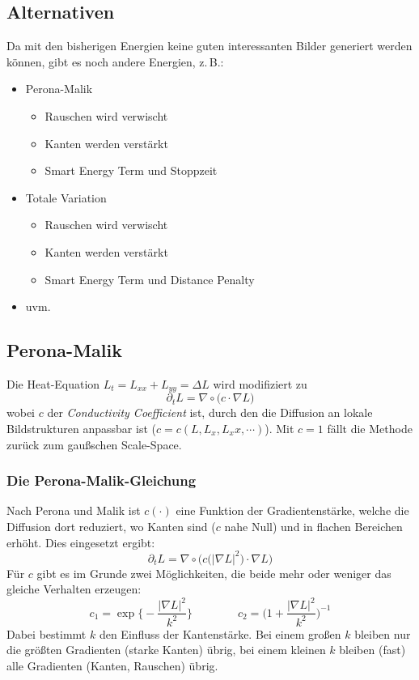 		\subsection{Alternativen}
			Da mit den bisherigen Energien keine guten interessanten Bilder generiert werden können, gibt es noch andere Energien, z.\,B.:
			\begin{itemize}
				\item Perona-Malik
					\begin{itemize}
						\item Rauschen wird verwischt
						\item Kanten werden verstärkt
						\item Smart Energy Term und Stoppzeit
					\end{itemize}
				\item Totale Variation
					\begin{itemize}
						\item Rauschen wird verwischt
						\item Kanten werden verstärkt
						\item Smart Energy Term und Distance Penalty
					\end{itemize}
				\item uvm.
			\end{itemize}

		\subsection{Perona-Malik}
			Die Heat-Equation \( L_t = L_{xx} + L_{yy} = \Delta L \) wird modifiziert zu
			\begin{equation*}
				\partial_t L = \nabla \circ \big( c \cdot \nabla L \big)
			\end{equation*}
			wobei \(c\) der \emph{Conductivity Coefficient} ist, durch den die Diffusion an lokale Bildstrukturen anpassbar ist (\dh \( c = c(L, L_x, L_xx, \cdots) \)). Mit \( c = 1 \) fällt die Methode zurück zum gaußschen Scale-Space.

			\subsubsection{Die Perona-Malik-Gleichung}
				Nach Perona und Malik ist \( c(\cdot) \) eine Funktion der Gradientenstärke, welche die Diffusion dort reduziert, wo Kanten sind (\(c\) nahe Null) und in flachen Bereichen erhöht. Dies eingesetzt ergibt:
				\begin{equation*}
					\partial_t L = \nabla \circ \Big( c\big( \lvert \nabla L \rvert^2 \big) \cdot \nabla L \Big)
				\end{equation*}
				Für \(c\) gibt es im Grunde zwei Möglichkeiten, die beide mehr oder weniger das gleiche Verhalten erzeugen:
				\begin{equation*}
					c_1 = \exp \Bigg\{ -\frac{\lvert \nabla L \rvert^2}{k^2} \Bigg\} \quad\quad\quad\quad c_2 = \Bigg( 1 + \frac{\lvert \nabla L \rvert^2}{k^2} \Bigg)^{-1}
				\end{equation*}
				Dabei bestimmt \(k\) den Einfluss der Kantenstärke. Bei einem großen \(k\) bleiben nur die größten Gradienten (starke Kanten) übrig, bei einem kleinen \(k\) bleiben (fast) alle Gradienten (Kanten, Rauschen) übrig.

